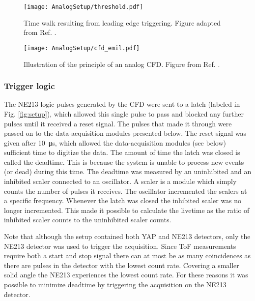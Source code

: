 \documentclass[main.tex]{subfiles}
\begin{document}
\begin{figure}[h]
    \centering
        \texttt{[image: AnalogSetup/threshold.pdf]}
        \caption[Time walk resulting from leading edge triggering]{Time walk resulting from leading edge triggering. Figure adapted from Ref. \cite{rofors}.}
    \label{fig:discriminator}
\end{figure}

\begin{figure}[h]
    \centering
        \texttt{[image: AnalogSetup/cfd\_emil.pdf]}
        \caption[CFD trigger principle]{Illustration of the principle of an analog CFD. Figure from Ref. \cite{rofors}.}
    \label{fig:cfd}
\end{figure}



\subsubsection{Trigger logic}
The NE213 logic pulses generated by the CFD were sent to a latch (labeled  in Fig. \ref{fig:setup}), which allowed this single pulse to pass and blocked any further pulses until it received a reset signal. The pulses that made it through were passed on to the data-acquisition modules presented below. The reset signal was given after \SI{10}{\micro\second}, which allowed the data-acquisition modules (see below) sufficient time to digitize the data. The amount of time the latch was closed is called the deadtime. This is because the system is unable to process new events (or dead) during this time. The deadtime was measured by an uninhibited and an inhibited scaler connected to an oscillator. A scaler is a module which simply counts the number of pulses it receives. The oscillator incremented the scalers at a specific frequency. Whenever the latch was closed the inhibited scaler was no longer incremented. This made it possible to calculate the livetime as the ratio of inhibited scaler counts to the uninhibited scaler counts.

Note that although the setup contained both YAP and NE213 detectors, only the NE213 detector was used to trigger the acquisition. Since ToF measurements require both a start and stop signal there can at most be as many coincidences as there are pulses in the detector with the lowest count rate. Covering a smaller solid angle the NE213 experiences the lowest count rate. For these reasons it was possible to minimize deadtime by triggering the acquisition on the  NE213 detector.
\end{document}
